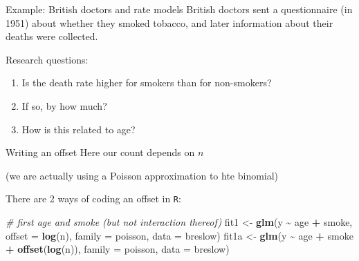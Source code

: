 \documentclass[
  ignorenonframetext,
]{beamer}
\newenvironment{Shaded}{\begin{snugshade}}{\end{snugshade}}
\newcommand{\AttributeTok}[1]{\textcolor[rgb]{0.13,0.29,0.53}{#1}}
\newcommand{\CommentTok}[1]{\textcolor[rgb]{0.56,0.35,0.01}{\textit{#1}}}
\newcommand{\FunctionTok}[1]{\textcolor[rgb]{0.13,0.29,0.53}{\textbf{#1}}}
\newcommand{\NormalTok}[1]{#1}
\newcommand{\OtherTok}[1]{\textcolor[rgb]{0.56,0.35,0.01}{#1}}
\newcommand{\SpecialCharTok}[1]{\textcolor[rgb]{0.81,0.36,0.00}{\textbf{#1}}}
\providecommand{\tightlist}{%
  \setlength{\itemsep}{0pt}\setlength{\parskip}{0pt}}
\begin{document}
\begin{frame}[fragile]
\begin{block}{Example: British doctors and rate models}
\protect\hypertarget{example-british-doctors-and-rate-models}{}
British doctors sent a questionnaire (in 1951) about whether they smoked
tobacco, and later information about their deaths were collected.

Research questions:

\begin{enumerate}
[1)]
\tightlist
\item
  Is the death rate higher for smokers than for non-smokers?
\item
  If so, by how much?
\item
  How is this related to age?
\end{enumerate}

\begin{Shaded}
\end{Shaded}
\end{block}
\end{frame}

\begin{frame}[fragile]{Writing an offset}
\protect\hypertarget{writing-an-offset}{}
Here our count depends on \(n\)

(we are actually using a Poisson approximation to hte binomial)

There are 2 ways of coding an offset in \texttt{R}:

\begin{Shaded}
\begin{Highlighting}[]
\CommentTok{\# first age and smoke (but not interaction thereof)}
\NormalTok{fit1 }\OtherTok{\textless{}{-}} \FunctionTok{glm}\NormalTok{(y }\SpecialCharTok{\textasciitilde{}}\NormalTok{ age }\SpecialCharTok{+}\NormalTok{ smoke, }\AttributeTok{offset =} \FunctionTok{log}\NormalTok{(n), }\AttributeTok{family =}\NormalTok{ poisson, }\AttributeTok{data =}\NormalTok{ breslow)}
\NormalTok{fit1a }\OtherTok{\textless{}{-}} \FunctionTok{glm}\NormalTok{(y }\SpecialCharTok{\textasciitilde{}}\NormalTok{ age }\SpecialCharTok{+}\NormalTok{ smoke }\SpecialCharTok{+} \FunctionTok{offset}\NormalTok{(}\FunctionTok{log}\NormalTok{(n)), }\AttributeTok{family =}\NormalTok{ poisson, }\AttributeTok{data =}\NormalTok{ breslow)}
\end{Highlighting}
\end{Shaded}
\end{frame}
\end{document}
